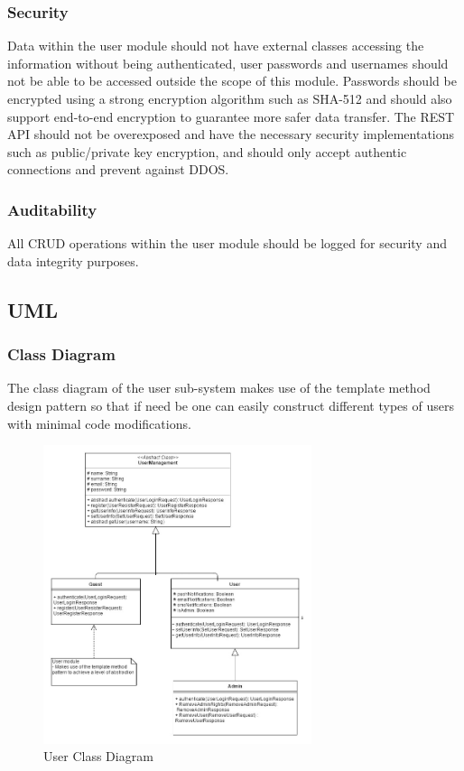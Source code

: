 \subsubsection{Security}
Data within the user module should not have external classes accessing the information without being authenticated, user passwords and usernames should not be able to be accessed outside the scope of this module. Passwords should be encrypted using a strong encryption algorithm such as SHA-512 and should also support end-to-end encryption to guarantee more safer data transfer. The REST API should not be overexposed and have the necessary security implementations such as public/private key encryption, and should only accept authentic connections and prevent against DDOS.

\subsubsection{Auditability}
All CRUD operations within the user module should be logged for security and data integrity purposes.

\subsection{UML}
\subsubsection{Class Diagram}
The class diagram of the user sub-system makes use of the template method design pattern so that if need be one can easily construct different types of users with minimal code modifications.

\begin{figure}[H]
	\centering
	\includegraphics[width=0.7\textwidth]{user/img/UserClassDiagram.jpg}
	\caption{User Class Diagram}
\end{figure}



